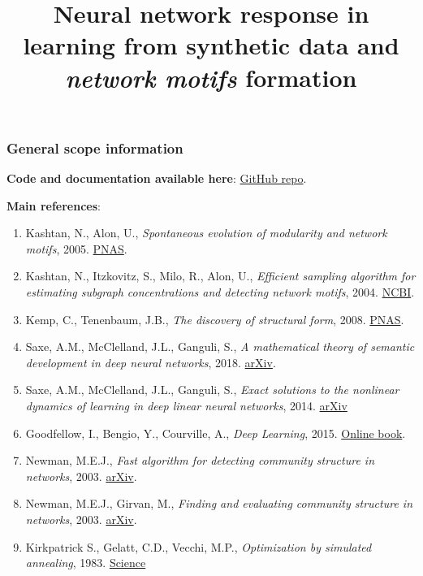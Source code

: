 \documentclass[a4paper,12pt]{article}
\title{\Large \sffamily \textbf{Neural network response in learning from synthetic data and \textit{network motifs} formation}}
\date{}
\begin{document}
\maketitle
\tableofcontents

\newpage

\subsubsection*{General scope information}
\noindent \textbf{Code and documentation available here}: \href{https://github.com/MatteoZambra/SM_ML__Thesis}{GitHub repo}.

\noindent \textbf{Main references}:
\begin{enumerate}[(1)]
	\item Kashtan, N., Alon, U., \textit{Spontaneous evolution of modularity and network motifs}, 2005. \href{https://www.pnas.org/content/102/39/13773}{PNAS}.
	\item Kashtan, N., Itzkovitz, S., Milo, R., Alon, U., \textit{Efficient sampling algorithm for estimating subgraph concentrations and detecting network motifs}, 2004. \href{https://www.ncbi.nlm.nih.gov/pubmed/15001476}{NCBI}.
	\item Kemp, C., Tenenbaum, J.B., \textit{The discovery of structural form}, 2008. \href{https://www.pnas.org/content/105/31/10687}{PNAS}.
	\item Saxe, A.M., McClelland, J.L., Ganguli, S., \textit{A mathematical theory of semantic development in deep neural networks}, 2018. \href{https://arxiv.org/abs/1810.10531}{arXiv}.
	\item Saxe, A.M., McClelland, J.L., Ganguli, S., \textit{Exact solutions to the nonlinear dynamics of learning in deep linear neural networks}, 2014. \href{https://arxiv.org/abs/1312.6120}{arXiv}
	\item Goodfellow, I., Bengio, Y., Courville, A., \textit{Deep Learning}, 2015. \href{https://www.deeplearningbook.org/}{Online book}.
	\item Newman, M.E.J., \textit{Fast algorithm for detecting community structure in networks}, 2003. \href{https://arxiv.org/abs/cond-mat/0309508}{arXiv}.
	\item Newman, M.E.J., Girvan, M., \textit{Finding and evaluating community structure in networks}, 2003. \href{https://arxiv.org/abs/cond-mat/0308217}{arXiv}.
	\item Kirkpatrick S., Gelatt, C.D., Vecchi, M.P., \textit{Optimization by simulated annealing}, 1983. \href{https://science.sciencemag.org/content/220/4598/671}{Science}
\end{enumerate}
\end{document}
